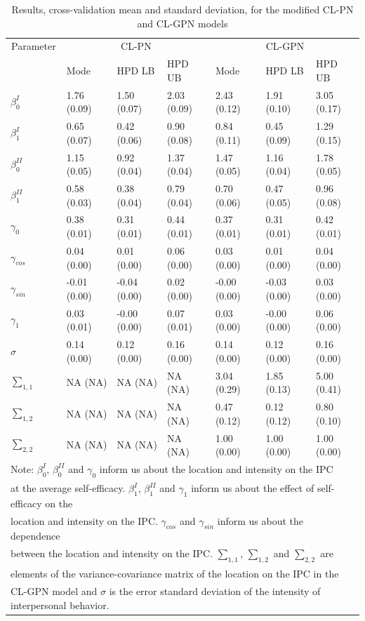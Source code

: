 \documentclass[man,mask]{apa6}
\begin{document}
\begin{table}

\caption{\label{tab:estCLGPN}Results, cross-validation mean and standard deviation, for the modified CL-PN and CL-GPN models}
\centering
\begin{tabular}[t]{lllllll}
\toprule
\multicolumn{1}{c}{Parameter} & \multicolumn{3}{c}{CL-PN} & \multicolumn{3}{c}{CL-GPN} \\
\cmidrule(l{2pt}r{2pt}){1-1} \cmidrule(l{2pt}r{2pt}){2-4} \cmidrule(l{2pt}r{2pt}){5-7}
  & Mode & HPD LB & HPD UB & Mode & HPD LB & HPD UB\\
\midrule
$\beta_0^{I}$ & 1.76 (0.09) & 1.50 (0.07) & 2.03 (0.09) & 2.43 (0.12) & 1.91 (0.10) & 3.05 (0.17)\\
$\beta_1^{I}$ & 0.65 (0.07) & 0.42 (0.06) & 0.90 (0.08) & 0.84 (0.11) & 0.45 (0.09) & 1.29 (0.15)\\
$\beta_0^{II}$ & 1.15 (0.05) & 0.92 (0.04) & 1.37 (0.04) & 1.47 (0.05) & 1.16 (0.04) & 1.78 (0.05)\\
$\beta_1^{II}$ & 0.58 (0.03) & 0.38 (0.04) & 0.79 (0.04) & 0.70 (0.06) & 0.47 (0.05) & 0.96 (0.08)\\
$\gamma_0$ & 0.38 (0.01) & 0.31 (0.01) & 0.44 (0.01) & 0.37 (0.01) & 0.31 (0.01) & 0.42 (0.01)\\
\addlinespace
$\gamma_{cos}$ & 0.04 (0.00) & 0.01 (0.00) & 0.06 (0.00) & 0.03 (0.00) & 0.01 (0.00) & 0.04 (0.00)\\
$\gamma_{sin}$ & -0.01 (0.00) & -0.04 (0.00) & 0.02 (0.00) & -0.00 (0.00) & -0.03 (0.00) & 0.03 (0.00)\\
$\gamma_1$ & 0.03 (0.01) & -0.00 (0.00) & 0.07 (0.01) & 0.03 (0.00) & -0.00 (0.00) & 0.06 (0.00)\\
$\sigma$ & 0.14 (0.00) & 0.12 (0.00) & 0.16 (0.00) & 0.14 (0.00) & 0.12 (0.00) & 0.16 (0.00)\\
$\sum_{1,1}$ & NA (NA) & NA (NA) & NA (NA) & 3.04 (0.29) & 1.85 (0.13) & 5.00 (0.41)\\
\addlinespace
$\sum_{1,2}$ & NA (NA) & NA (NA) & NA (NA) & 0.47 (0.12) & 0.12 (0.12) & 0.80 (0.10)\\
$\sum_{2,2}$ & NA (NA) & NA (NA) & NA (NA) & 1.00 (0.00) & 1.00 (0.00) & 1.00 (0.00)\\
\bottomrule
\multicolumn{7}{l}{Note: $\beta_0^{I}$, $\beta_0^{II}$ and $\gamma_0$ inform us about the location and intensity on the IPC}\\
\multicolumn{7}{l}{at the average self-efficacy. $\beta_1^{I}$, $\beta_1^{II}$ and $\gamma_1$ inform us about the effect of self-efficacy on the}\\
\multicolumn{7}{l}{location and intensity on the IPC. $\gamma_{cos}$ and $\gamma_{sin}$ inform us about the dependence}\\
\multicolumn{7}{l}{ between the location and intensity on the IPC. $\sum_{1,1}$, $\sum_{1,2}$ and $\sum_{2,2}$ are}\\
\multicolumn{7}{l}{elements of the variance-covariance matrix of the location on the IPC in the}\\
\multicolumn{7}{l}{CL-GPN model and $\sigma$ is the error standard deviation of the intensity of interpersonal behavior.}\\


\end{tabular}
\end{table}
\end{document}
